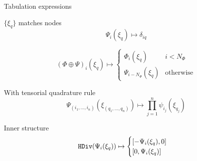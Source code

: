 \documentclass[cmyk,luatex,a0paper,portrait]{baposter}
\begin{document}
\begin{poster}
\begin{posterbox}[name=structure, column=0, below=introduction,
    span=3, height=0.275,
    ]{Tabulation expressions}
\begin{tcbraster}[raster columns=6,raster equal height=rows]
      \begin{tcolorbox}[title=Underintegration, raster multicolumn=2, height=1.9cm]
        $\{\xi_q\}$ matches nodes
        \tcblower
        \vspace{-0.5\baselineskip}
        \begin{equation*}
          \Psi_i(\xi_q) \mapsto \delta_{iq}
        \end{equation*}
      \end{tcolorbox}
      \begin{tcolorbox}[title=Enriched, raster multicolumn=4,
        height=1.9cm, valign upper=center]
        \vspace{-\baselineskip}
        \begin{equation*}
          {(\Phi \oplus \Psi)}_i(\xi_q) \mapsto
          \begin{cases}
            \Phi_i(\xi_q) &\text{$i < N_\Phi$}\\
            \Psi_{i-N_\Phi}(\xi_q) &\text{otherwise}
          \end{cases}
        \end{equation*}
      \end{tcolorbox}
      \begin{tcolorbox}[title=Tensor product, raster multicolumn=3, height=2.25cm]
        With tensorial quadrature rule
        \tcblower
        \vspace{-0.96\baselineskip}
        \begin{equation*}
          \Psi_{(i_1, \dots, i_n)}(\xi_{(q_1, \dots, q_n)}) \mapsto \prod_{j=1}^{n} \psi_{i_j}(\xi_{q_j})
        \end{equation*}
      \end{tcolorbox}
      \begin{tcolorbox}[title=$\mathbf{H}(\text{div}/\text{curl})$,
        raster multicolumn=3, height=2.25cm]
        Inner structure
        \vspace{-0.5\baselineskip}
        \begin{equation*}
          \text{\texttt{HDiv}}(\Psi_i(\xi_q)) \mapsto
          \begin{cases}
            [-\Psi_i(\xi_q), 0]\\
            [0, \Psi_i(\xi_q)]
          \end{cases}
        \end{equation*}
      \end{tcolorbox}
    \end{tcbraster}
  \end{posterbox}


\end{poster}
\end{document}
